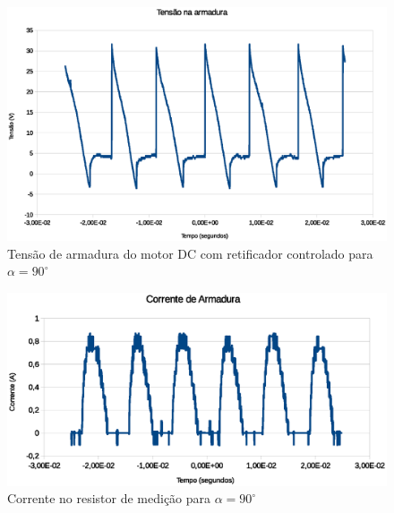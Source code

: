 \documentclass{article}
\begin{document}
\begin{figure}[H]
	\centering
	\includegraphics[width=\linewidth]{Dados/Retificador/1}
	\caption{Tensão de armadura do motor DC com retificador controlado para $\alpha=90^\circ$}
	\label{fig:varet}
\end{figure}

\begin{figure}[H]
	\centering
	\includegraphics[width=\linewidth]{Dados/Retificador/corrente}
	\caption{Corrente no resistor de medição para $\alpha=90^\circ$}
	\label{fig:iaret}
\end{figure}
\end{document}
